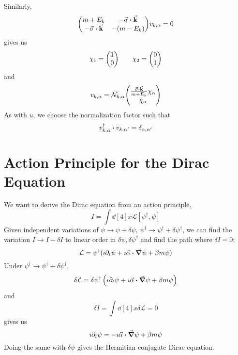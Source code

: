 \documentclass[a4paper,twoside,master.tex]{subfiles}
\begin{document}
Similarly,
\begin{equation}
    \mqty(m + E_k & - \va{\sigma} \vdot \va{k} \\ - \va{\sigma} \vdot \va{k} & - (m - E_k)) v_{k, \alpha} = 0
\end{equation}
gives us
\begin{equation}
    \chi_1 = \mqty(1\\0) \qquad \chi_2 = \mqty(0\\1)
\end{equation}
and
\begin{equation}
    v_{k, \alpha} = \tilde{\mathcal{N}}_{k, \alpha} \mqty(\frac{\va{\sigma} \vdot \va{k}}{m + E_k} \chi_{\alpha} \\ \chi_{\alpha})
\end{equation}
As with $ u $, we choose the normalization factor such that
\begin{equation}
    v^\dagger_{k, \alpha} \vdot v_{k, \alpha'} = \delta_{\alpha, \alpha'}
\end{equation}

\section{Action Principle for the Dirac Equation}\label{sec:action_principle_for_the_dirac_equation}

We want to derive the Dirac equation from an action principle,
\begin{equation}
    I = \int \dd[4]{x} \mathcal{L}[\psi^\dagger, \psi]
\end{equation}
Given independent variations of $ \psi \to \psi + \delta \psi $, $ \psi^\dagger \to \psi^\dagger + \delta \psi^\dagger $, we can find the variation $ I \to I + \delta I $ to linear order in $ \delta \psi, \delta \psi^\dagger $ and find the path where $ \delta I = 0 $:
\begin{equation}
    \mathcal{L} = \psi^\dagger (\imath \partial_t \psi + \imath \va{\alpha} \vdot \grad{\psi} + \beta m \psi)
\end{equation}
Under $ \psi^\dagger \to \psi^\dagger + \delta \psi^\dagger $,
\begin{equation}
    \delta \mathcal{L} = \delta \psi^\dagger \left( \imath \partial_t \psi + \imath \va{\alpha} \vdot \grad{\psi} + \beta m \psi \right)
\end{equation}
and
\begin{equation}
    \delta I = \int \dd[4]{x} \delta \mathcal{L} = 0
\end{equation}
gives us
\begin{equation}
    \imath \partial_t \psi = - \imath \va{\alpha} \vdot \grad{\psi} + \beta m \psi
\end{equation}
Doing the same with $ \delta \psi $ gives the Hermitian conjugate Dirac equation.
\end{document}
